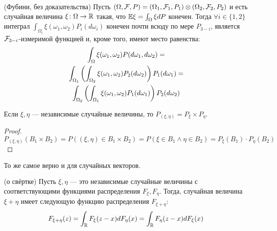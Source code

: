 \begin{theorem} (Фубини, без доказательства)
	Пусть $(\Omega, \mathcal{F}, P) = (\Omega_1, \mathcal{F}_1, P_1) \otimes (\Omega_2, \mathcal{F}_2, P_2)$ и есть случайная величина $\xi \colon \Omega \to \mathbb{R}$ такая, что $\mathbb{E}\xi = \int_\Omega \xi dP$ конечен. Тогда $\forall i \in \{1, 2\}$ интеграл $\int_{\Omega_i} \xi(\omega_1, \omega_2) P_i(d\omega_i)$ конечен почти всюду по мере $P_{3 - i}$, является $\mathcal{F}_{3 - i}$-измеримой функцией и, кроме того, имеют место равенства:
	\begin{multline*}
		\int_\Omega \xi(\omega_1, \omega_2) P(d\omega_1, d\omega_2) =
		\\
		\int_{\Omega_1} \left(\int_{\Omega_2} \xi(\omega_1, \omega_2)P_2(d\omega_2)\right) P_1(d\omega_1) =
		\\
		\int_{\Omega_2} \left(\int_{\Omega_1} \xi(\omega_1, \omega_2)P_1(d\omega_1)\right) P_2(d\omega_2)
	\end{multline*}
\end{theorem}

\begin{proposition}
	Если $\xi, \eta$ --- независимые случайные величины, то $P_{(\xi, \eta)} = P_\xi \times P_\eta$.
\end{proposition}

\begin{proof}
	\[
		P_{(\xi, \eta)}(B_1 \times B_2) = P((\xi, \eta) \in B_1 \times B_2) = P(\xi \in B_1 \wedge \eta \in B_2) = P_\xi(B_1) \cdot P_\eta(B_2)
	\]
\end{proof}

\begin{note}
	То же самое верно и для случайных векторов.
\end{note}

\begin{lemma} (о свёртке)
	Пусть $\xi, \eta$ --- это независимые случайные величины с соответствующими функциями распределения $F_\xi, F_\eta$. Тогда, случайная величина $\xi + \eta$ имеет следующую функцию распределения $F_{\xi + \eta}$:
	\[
		F_{\xi + \eta}(z) = \int_{\mathbb{R}} F_\xi(z - x)dF_\eta(x) = \int_{\mathbb{R}} F_\eta(z - x)dF_\xi(x)
	\]
\end{lemma}

